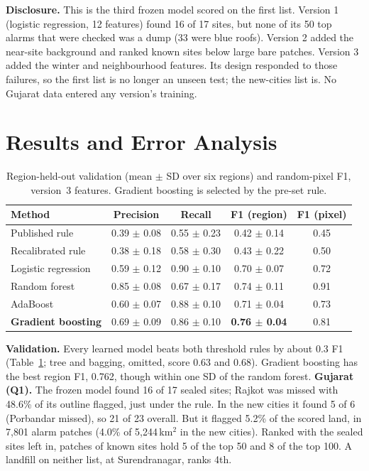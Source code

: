 \documentclass{article}
\begin{document}
\textbf{Disclosure.} This is the third frozen model scored on the first list. Version 1 (logistic regression, 12 features) found 16 of 17 sites, but none of its 50 top alarms that were checked was a dump (33 were blue roofs). Version 2 added the near-site background and ranked known sites below large bare patches. Version 3 added the winter and neighbourhood features. Its design responded to those failures, so the first list is no longer an unseen test; the new-cities list is. No Gujarat data entered any version's training.

\section{Results and Error Analysis}
\begin{table}[t]
\centering
\caption{Region-held-out validation (mean $\pm$ SD over six regions) and random-pixel F1, version~3 features. Gradient boosting is selected by the pre-set rule.}
\label{tab:val}
\small
\setlength{\tabcolsep}{4pt}
\begin{tabular}{lcccc}
\toprule
Method & Precision & Recall & F1 (region) & F1 (pixel) \\
\midrule
Published rule \citep{bhajantri2026} & 0.39 $\pm$ 0.08 & 0.55 $\pm$ 0.23 & 0.42 $\pm$ 0.14 & 0.45 \\
Recalibrated rule & 0.38 $\pm$ 0.18 & 0.58 $\pm$ 0.30 & 0.43 $\pm$ 0.22 & 0.50 \\
Logistic regression & 0.59 $\pm$ 0.12 & 0.90 $\pm$ 0.10 & 0.70 $\pm$ 0.07 & 0.72 \\
Random forest & 0.85 $\pm$ 0.08 & 0.67 $\pm$ 0.17 & 0.74 $\pm$ 0.11 & 0.91 \\
AdaBoost & 0.60 $\pm$ 0.07 & 0.88 $\pm$ 0.10 & 0.71 $\pm$ 0.04 & 0.73 \\
\textbf{Gradient boosting} & 0.69 $\pm$ 0.09 & 0.86 $\pm$ 0.10 & \textbf{0.76 $\pm$ 0.04} & 0.81 \\
\bottomrule
\end{tabular}
\end{table}

\textbf{Validation.} Every learned model beats both threshold rules by about 0.3 F1 (Table~\ref{tab:val}; tree and bagging, omitted, score 0.63 and 0.68). Gradient boosting has the best region F1, 0.762, though within one SD of the random forest. \textbf{Gujarat (Q1).} The frozen model found 16 of 17 sealed sites; Rajkot was missed with 48.6\% of its outline flagged, just under the rule. In the new cities it found 5 of 6 (Porbandar missed), so 21 of 23 overall. But it flagged 5.2\% of the scored land, in 7,801 alarm patches (4.0\% of 5,244\,km$^2$ in the new cities). Ranked with the sealed sites left in, patches of known sites hold 5 of the top 50 and 8 of the top 100. A landfill on neither list, at Surendranagar, ranks 4th.
\end{document}
